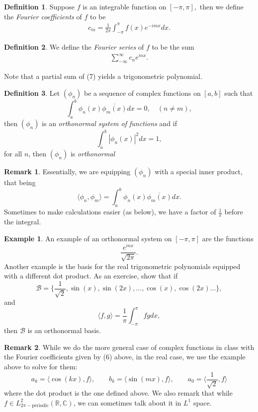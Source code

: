 \documentclass[10pt, oneside]{article}
\newcommand{\bbR}{\mathbb{R}}
\newcommand{\bbC}{\mathbb{C}}
\theoremstyle{definition}
\newtheorem{exmp}{Example}[section]
\newtheorem{defn}{Definition}
\newtheorem{rem}{Remark}
\begin{document}
 \begin{defn}
     Suppose $f$ is an integrable function on $[-\pi, \pi],$ then we define the \textit{Fourier coefficients} of $f$ to be 
     \begin{align}
         c_m = \frac{1}{2\pi}\int_{-\pi}^\pi f(x)e^{-imx}dx.
     \end{align}
 \end{defn}
 \begin{defn}
     We define the \textit{Fourier series} of $f$ to be the sum
     \begin{align}
         \sum_{-\infty}^\infty c_n e^{inx}.
     \end{align} 
 \end{defn}
 Note that a partial sum of (7) yields a trigonometric polynomial. 
 \begin{defn}
     Let $(\phi_n)$ be a sequence of complex functions on $[a,b]$ such that 
     \[\int_a^b \phi_n(x)\overline{\phi_m (x)} dx= 0, \quad (n\neq m),\] then $(\phi_n)$ is an \textit{orthonormal system of functions} and if 
     \[\int_a^b |\phi_n(x)|^2 dx = 1,\] for all $n$, then $(\phi_n)$ is \textit{orthonormal}
 \end{defn}
 \begin{rem}
     Essentially, we are equipping $(\phi_n)$ with a special inner product, that being 
     \[\langle \phi_n, \phi_m\rangle = \int_a^b \phi_n(x)\overline{\phi_m (x)}dx.\] Sometimes to make calculations easier (as below), we have a factor of $\frac{1}{\pi}$ before the integral.
 \end{rem}
 \begin{exmp}
     An example of an orthonormal system on $[-\pi, \pi]$ are the functions 
     \[\frac{e^{inx}}{\sqrt{2\pi}}.\]
     Another example is the basis for the real trigonometric polynomials equipped with a different dot product. As an exercise, show that if 
     \[\mathcal{B} = \{\frac{1}{\sqrt{2}}, \sin(x), \sin(2x), \dots, \cos(x), \cos(2x)\dots\},\] and
     \[\langle f,g \rangle = \frac{1}{\pi}\int_{-\pi}^\pi fg dx,\] then $\mathcal{B}$ is an orthonormal basis.
 \end{exmp}
 \begin{rem}
     While we do the more general case of complex functions in class with the Fourier coefficients given by (6) above, in the real case, we use the example above to solve for them:
     \[a_k = \langle \cos(kx), f \rangle, \qquad b_k = \langle \sin(mx), f \rangle,\qquad a_0 = \langle \frac{1}{\sqrt{2}}, f\rangle\] where the dot product is the one defined above. We also remark that while $f\in L^2_{2\pi-\text{periodic}}(\bbR, \bbC)$, we can sometimes talk about it in $L^1$ space.
 \end{rem}
 
\end{document}
